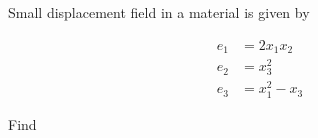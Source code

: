 % 
% 
% 
% 
% 
% 
% 
% 
% 
% 
% 
% 
\begin{Exercise}[
title={Strain tensor for a small displacement},
label={problem:strain:ps1q2a}
]

%
Small displacement field in a material is given by

\begin{align}\label{eqn:continuumProblemSet1:30}
e_1 &= 2 x_1 x_2 \\
e_2 &= x_3^2 \\
e_3 &= x_1^2 - x_3
\end{align}

Find

\label{problem:strain:ps1q2a1}
\label{problem:strain:ps1q2a2}
\end{Exercise}


